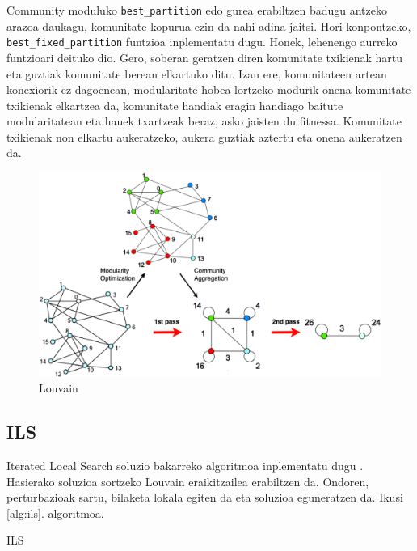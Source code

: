 \documentclass[sigconf]{acmart}
\begin{document}
Community moduluko \texttt{best\_partition} edo gurea erabiltzen badugu antzeko arazoa daukagu, komunitate kopurua ezin da nahi adina jaitsi. Hori konpontzeko, \texttt{best\_fixed\_partition} funtzioa inplementatu dugu. Honek, lehenengo aurreko funtzioari deituko dio. Gero, soberan geratzen diren komunitate txikienak hartu eta guztiak komunitate berean elkartuko ditu. Izan ere, komunitateen artean konexiorik ez dagoenean, modularitate hobea lortzeko modurik onena komunitate txikienak elkartzea da, komunitate handiak eragin handiago baitute modularitatean eta hauek txartzeak beraz, asko jaisten du fitnessa. Komunitate txikienak non elkartu aukeratzeko, aukera guztiak aztertu eta onena aukeratzen da.

\begin{figure}
    \centering
    \includegraphics[width=\linewidth]{Louvain}
    \caption{Louvain}
    \label{fig:louvain}
\end{figure}

\subsection{ILS}
Iterated Local Search \cite{liu2020iterated} soluzio bakarreko algoritmoa inplementatu dugu . Hasierako soluzioa sortzeko Louvain eraikitzailea erabiltzen da. Ondoren, perturbazioak sartu, bilaketa lokala egiten da eta soluzioa eguneratzen da. Ikusi \ref{alg:ils}. algoritmoa.

\begin{algorithm}
    \caption{ILS}
    \label{alg:ils}
\end{algorithm}
\end{document}
